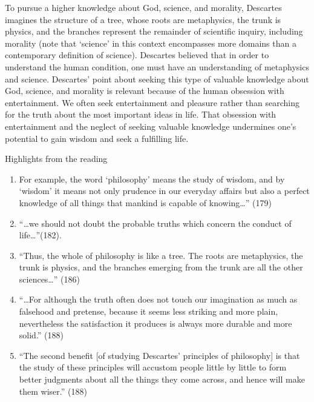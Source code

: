 \documentclass[
]{book}
\providecommand{\tightlist}{%
  \setlength{\itemsep}{0pt}\setlength{\parskip}{0pt}}
\begin{document}
To pursue a higher knowledge about God, science, and morality, Descartes imagines the structure of a tree, whose roots are metaphysics, the trunk is physics, and the branches represent the remainder of scientific inquiry, including morality (note that `science' in this context encompasses more domains than a contemporary definition of science). Descartes believed that in order to understand the human condition, one must have an understanding of metaphysics and science. Descartes' point about seeking this type of valuable knowledge about God, science, and morality is relevant because of the human obsession with entertainment. We often seek entertainment and pleasure rather than searching for the truth about the most important ideas in life. That obsession with entertainment and the neglect of seeking valuable knowledge undermines one's potential to gain wisdom and seek a fulfilling life.

Highlights from the reading

\begin{enumerate}
\def\labelenumi{\arabic{enumi}.}
\tightlist
\item
  For example, the word `philosophy' means the study of wisdom, and by `wisdom' it means not only prudence in our everyday affairs but also a perfect knowledge of all things that mankind is capable of knowing\ldots'' (179)\\
\item
  ``\ldots we should not doubt the probable truths which concern the conduct of life\ldots{}''(182).\\
\item
  ``Thus, the whole of philosophy is like a tree. The roots are metaphysics, the trunk is physics, and the branches emerging from the trunk are all the other sciences\ldots{}'' (186)\\
\item
  ``\ldots For although the truth often does not touch our imagination as much as falsehood and pretense, because it seems less striking and more plain, nevertheless the satisfaction it produces is always more durable and more solid.'' (188)\\
\item
  ``The second benefit {[}of studying Descartes' principles of philosophy{]} is that the study of these principles will accustom people little by little to form better judgments about all the things they come across, and hence will make them wiser.'' (188)
\end{enumerate}
\end{document}
